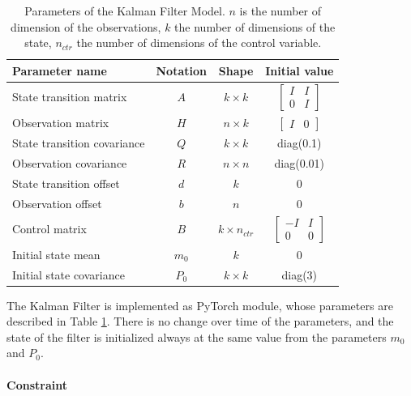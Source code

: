 \documentclass{article}
\begin{document}
\begin{table}
\caption{Parameters of the Kalman Filter Model. $n$ is the number of dimension of the observations, $k$ the number of dimensions of the state, $n_{ctr}$ the number of dimensions of the control variable.}
\label{table:parameters}
\vspace{5pt}
\centering
\begin{tabular}{l c c c}
\toprule
    \bfseries Parameter name & \bfseries Notation & \bfseries Shape & \bfseries Initial value\\
    \hline
    \noalign{\vspace{4pt}}
    State transition matrix & $A$ & $k \times k$ & $\begin{bmatrix}I & I \\ 0 & I\end{bmatrix}$ \\
    \noalign{\vspace{4pt}}
    Observation matrix & $H$ & $n \times k$ & $\begin{bmatrix}I & 0 \end{bmatrix}$ \\
    State transition covariance & $Q$ & $k \times k$ & diag(0.1) \\
    Observation covariance & $R$ & $n \times n$ & diag(0.01)\\
    State transition offset & $d$ & $k$ & 0 \\
    Observation offset & $b$ & $n$ & 0 \\
    Control matrix & $B$ & $k \times n_{ctr}$ & $\begin{bmatrix} -I & I \\ 0 & 0 \end{bmatrix}$ \\
    Initial state mean & $m_0$ & $k$ & $0$ \\
    Initial state covariance & $P_0$ & $k \times k$ & diag(3) \\
\bottomrule
\end{tabular}
\end{table}

The Kalman Filter is implemented as PyTorch module, whose parameters are described in Table \ref{table:parameters}.
There is no change over time of the parameters, and the state of the filter is initialized always at the same value from the parameters $m_0$ and $P_0$.

\paragraph{Constraint}
\end{document}
